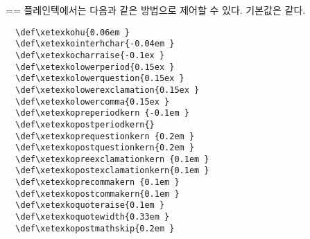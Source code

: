 \documentclass[a4paper]{article}
\def\grayvrule{{\color{white!80!black}\vrule width 2pt}}
\newenvironment{plaintex}
  {\setbox0=\vbox\bgroup\hsize=\dimexpr\textwidth-12pt\relax\medbreak\small}
  {\medbreak\egroup \par\medskip
    \ifdim\ht0<\dimexpr\pagegoal-\pagetotal\relax
      \hbox{\grayvrule\kern10pt\box0}%
    \else
      \setbox2=\vsplit0 to\dimexpr\pagegoal-\pagetotal\relax
      \lineskip=0pt
      \ifvoid2 \else\hbox{\grayvrule\kern10pt\box2}\fi
      \ifvoid0 \else\hbox{\grayvrule\kern10pt\box0}\fi
    \fi \par\medskip }
\begin{document}
\begin{plaintex}
플레인텍에서는 다음과 같은 방법으로 제어할 수 있다. 기본값은  같다.
\begin{verbatim}
  \def\xetexkohu{0.06em }
  \def\xetexkointerhchar{-0.04em }
  \def\xetexkocharraise{-0.1ex }
  \def\xetexkolowerperiod{0.15ex }
  \def\xetexkolowerquestion{0.15ex }
  \def\xetexkolowerexclamation{0.15ex }
  \def\xetexkolowercomma{0.15ex }
  \def\xetexkopreperiodkern {-0.1em }
  \def\xetexkopostperiodkern{}
  \def\xetexkoprequestionkern {0.2em }
  \def\xetexkopostquestionkern{0.2em }
  \def\xetexkopreexclamationkern {0.1em }
  \def\xetexkopostexclamationkern{0.1em }
  \def\xetexkoprecommakern {0.1em }
  \def\xetexkopostcommakern{0.1em }
  \def\xetexkoquoteraise{0.1em }
  \def\xetexkoquotewidth{0.33em }
  \def\xetexkopostmathskip{0.2em }
\end{verbatim}
\end{plaintex}
\end{document}
